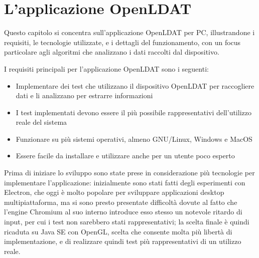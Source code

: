 \setlength{\parskip}{1em}
\setlength{\parindent}{0pt}
\chapter{L'applicazione OpenLDAT}
\label{chap:app}

Questo capitolo si concentra sull'applicazione OpenLDAT per PC, illustrandone i requisiti, le tecnologie utilizzate, e i dettagli del funzionamento, con un focus particolare agli algoritmi che analizzano i dati raccolti dal dispositivo.

I requisiti principali per l'applicazione OpenLDAT sono i seguenti:
\begin{itemize}
	\item Implementare dei test che utilizzano il dispositivo OpenLDAT per raccogliere dati e li analizzano per estrarre informazioni
	\item I test implementati devono essere il più possibile rappresentativi dell'utilizzo reale del sistema
	\item Funzionare su più sistemi operativi, almeno GNU/Linux, Windows e MacOS
	\item Essere facile da installare e utilizzare anche per un utente poco esperto
\end{itemize}

Prima di iniziare lo sviluppo sono state prese in considerazione più tecnologie per implementare l'applicazione: inizialmente sono stati fatti degli esperimenti con Electron, che oggi è molto popolare per sviluppare applicazioni desktop multipiattaforma, ma si sono presto presentate difficoltà dovute al fatto che l'engine Chromium al suo interno introduce esso stesso un notevole ritardo di input, per cui i test non sarebbero stati rappresentativi; la scelta finale è quindi ricaduta su Java SE con OpenGL, scelta che consente molta più libertà di implementazione, e di realizzare quindi test più rappresentativi di un utilizzo reale.

